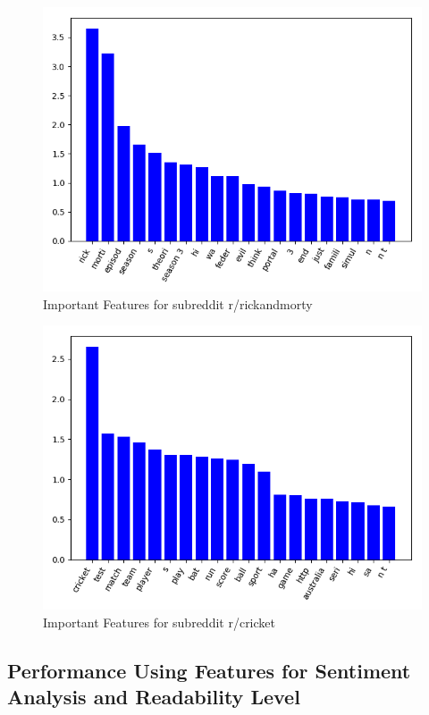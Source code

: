 \documentclass{sig-alternate-05-2015}
\begin{document}
\begin{figure}[H]
\centering
\includegraphics[width=\linewidth]{plots/coefficients-rickandmorty-dim-713.png}
\caption{Important Features for subreddit r/rickandmorty}
\label{fig:featureImportanceRickAndMorty}
\end{figure}

\begin{figure}[H]
\centering
\includegraphics[width=\linewidth]{plots/coefficients-cricket-dim-200.png}
\caption{Important Features for subreddit r/cricket}
\label{fig:featureImportanceCricket}
\end{figure}

\subsection{Performance Using Features for Sentiment Analysis and Readability Level}
\end{document}

